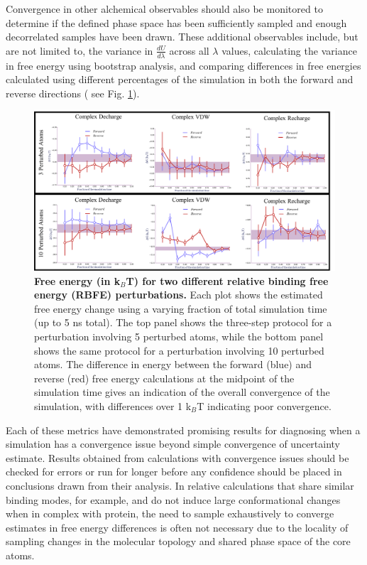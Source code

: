 \documentclass[9pt,bestpractices]{livecoms}
\begin{document}
%
Convergence in other alchemical observables should also be monitored to determine if the defined phase space has been sufficiently sampled and enough decorrelated samples have been drawn. These additional observables include, but are not limited to, the variance in $\frac{dU}{d\lambda}$ across all $\lambda$ values, calculating the variance in free energy using bootstrap analysis, and comparing differences in free energies calculated using different percentages of the simulation in both the forward and reverse directions ( see Fig. \ref{fig:convergence_forward_reverse}).
%
\begin{figure}[h!]
    \centering
    \includegraphics[width=0.95\linewidth]{figures/fig10_forward_reverse/Figure.pdf}
    \caption{\textbf{Free energy (in k$_{B}$T) for two different relative binding free energy (RBFE) perturbations.} 
    Each plot shows the estimated free energy change using a varying fraction of total simulation time (up to 5 ns total). 
    The top panel shows the three-step protocol for a perturbation involving 5 perturbed atoms, while the bottom panel shows the same protocol for a perturbation involving 10 perturbed atoms. The difference in energy between the forward (blue) and reverse (red) free energy calculations at the midpoint of the simulation time gives an indication of the overall convergence of the simulation, with differences over 1 k$_{B}$T indicating poor convergence.}
    \label{fig:convergence_forward_reverse}
\end{figure}
%
Each of these metrics have demonstrated promising results for diagnosing when a simulation has a convergence issue beyond simple convergence of uncertainty estimate. 
Results obtained from calculations with convergence issues should be checked for errors or run for longer before any confidence should be placed in conclusions drawn from their analysis.
In relative calculations that share similar binding modes, for example, and do not induce large conformational changes when in complex with protein, the need to sample exhaustively to converge estimates in free energy differences is often not necessary due to the locality of sampling changes in the molecular topology and shared phase space of the core atoms.
\end{document}
